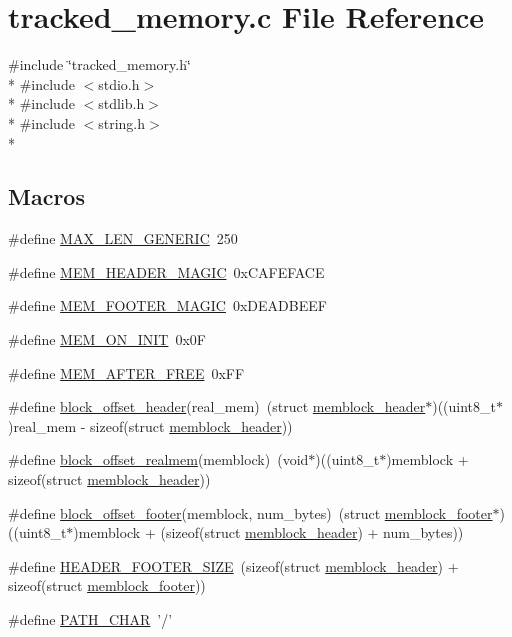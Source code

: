 \section{tracked\-\_\-memory.\-c File Reference}
\label{tracked__memory_8c}
{\ttfamily \#include \char`\"{}tracked\-\_\-memory.\-h\char`\"{}}\\*
{\ttfamily \#include $<$stdio.\-h$>$}\\*
{\ttfamily \#include $<$stdlib.\-h$>$}\\*
{\ttfamily \#include $<$string.\-h$>$}\\*
\subsection*{Macros}
\begin{DoxyCompactItemize}
\item 
\#define \hyperlink{tracked__memory_8c_ae6dbf32c394f00509d560b40c81bccc6}{M\-A\-X\-\_\-\-L\-E\-N\-\_\-\-G\-E\-N\-E\-R\-I\-C}~250
\item 
\#define \hyperlink{tracked__memory_8c_a2db6c9af5aa02be13a49f706da54385c}{M\-E\-M\-\_\-\-H\-E\-A\-D\-E\-R\-\_\-\-M\-A\-G\-I\-C}~0x\-C\-A\-F\-E\-F\-A\-C\-E
\item 
\#define \hyperlink{tracked__memory_8c_adb9b241eeb9083c288e77112c7e7b0a5}{M\-E\-M\-\_\-\-F\-O\-O\-T\-E\-R\-\_\-\-M\-A\-G\-I\-C}~0x\-D\-E\-A\-D\-B\-E\-E\-F
\item 
\#define \hyperlink{tracked__memory_8c_ada833569779d8c8a9b8415e8112c1fad}{M\-E\-M\-\_\-\-O\-N\-\_\-\-I\-N\-I\-T}~0x0\-F
\item 
\#define \hyperlink{tracked__memory_8c_ab4cd30097b76edd986e9f0db035b6279}{M\-E\-M\-\_\-\-A\-F\-T\-E\-R\-\_\-\-F\-R\-E\-E}~0x\-F\-F
\item 
\#define \hyperlink{tracked__memory_8c_a4535345fe0fa840b2b74ce4eaf6dd004}{block\-\_\-offset\-\_\-header}(real\-\_\-mem)~(struct \hyperlink{structmemblock__header}{memblock\-\_\-header}$\ast$)((uint8\-\_\-t$\ast$)real\-\_\-mem -\/ sizeof(struct \hyperlink{structmemblock__header}{memblock\-\_\-header}))
\item 
\#define \hyperlink{tracked__memory_8c_ad4ec1862e1c0007f85c0d0eb6b75ff91}{block\-\_\-offset\-\_\-realmem}(memblock)~(void$\ast$)((uint8\-\_\-t$\ast$)memblock + sizeof(struct \hyperlink{structmemblock__header}{memblock\-\_\-header}))
\item 
\#define \hyperlink{tracked__memory_8c_aff46be828cb143ee0ffde154ac547a46}{block\-\_\-offset\-\_\-footer}(memblock, num\-\_\-bytes)~(struct \hyperlink{structmemblock__footer}{memblock\-\_\-footer}$\ast$)((uint8\-\_\-t$\ast$)memblock + (sizeof(struct \hyperlink{structmemblock__header}{memblock\-\_\-header}) + num\-\_\-bytes))
\item 
\#define \hyperlink{tracked__memory_8c_a23fcee323662954abeea9a2b0d3d7bdf}{H\-E\-A\-D\-E\-R\-\_\-\-F\-O\-O\-T\-E\-R\-\_\-\-S\-I\-Z\-E}~(sizeof(struct \hyperlink{structmemblock__header}{memblock\-\_\-header}) + sizeof(struct \hyperlink{structmemblock__footer}{memblock\-\_\-footer}))
\item 
\#define \hyperlink{tracked__memory_8c_a83cebbffc784c0755f531e4c19abf8d0}{P\-A\-T\-H\-\_\-\-C\-H\-A\-R}~'/'
\end{DoxyCompactItemize}
